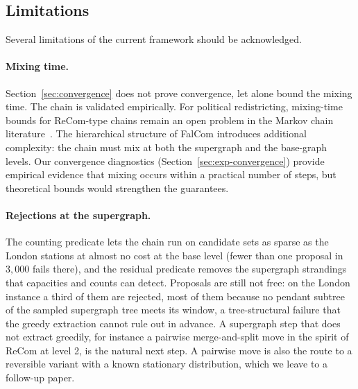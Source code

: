 \documentclass[preprint,12pt,authoryear]{elsarticle}
\theoremstyle{definition}
\begin{document}
\subsection{Limitations}
\label{sec:limitations}

Several limitations of the current framework should be acknowledged.



\paragraph{Mixing time.}
Section~\ref{sec:convergence} does not prove convergence, let alone bound the mixing time. The chain is validated empirically.  For political redistricting, mixing-time bounds for
ReCom-type chains remain an open problem in the Markov chain
literature~\citep{deford2021recombination}.  The hierarchical structure
of FalCom introduces additional complexity: the chain must mix at both
the supergraph and the base-graph levels.  Our convergence diagnostics
(Section~\ref{sec:exp-convergence}) provide empirical evidence that
mixing occurs within a practical number of steps, but theoretical
bounds would strengthen the guarantees.

\paragraph{Rejections at the supergraph.}
The counting predicate lets the chain run on candidate sets as sparse as
the London stations at almost no cost at the base level (fewer than one proposal in $3{,}000$ fails there), and the residual predicate removes the
supergraph strandings that capacities and counts can detect. Proposals
are still not free: on the London instance a third of them are
rejected, most of them because no pendant subtree of the sampled supergraph
tree meets its window, a tree-structural failure that the greedy
extraction cannot rule out in advance. A supergraph step that does not
extract greedily, for instance a pairwise merge-and-split move in the spirit of ReCom at level 2, is the natural next step. A pairwise move is also the route to a reversible variant with a known stationary distribution, which we leave to a follow-up paper.


\end{document}
